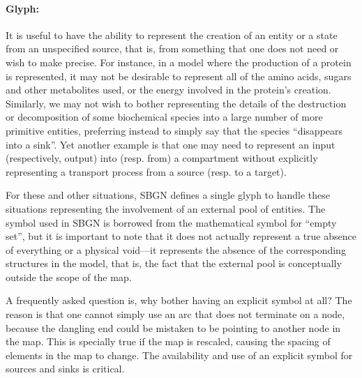 
\paragraph{Glyph: }
\label{sec:sourceSink}

It is useful to have the ability to represent the creation of an entity or
a state from an unspecified source, that is, from something that one does
not need or wish to make precise.  For instance, in a model where the
production of a protein is represented, it may not be desirable to
represent all of the amino acids, sugars and other metabolites used, or the
energy involved in the protein's creation.  Similarly, we may not wish to
bother representing the details of the destruction or decomposition of some
biochemical species into a large number of more primitive entities,
preferring instead to simply say that the species ``disappears into a
sink''.  Yet another example is that one may need to represent an input
(respectively, output) into (resp. from) a compartment without explicitly
representing a transport process from a source (resp. to a target).

For these and other situations, SBGN defines a single glyph to handle
these situations representing the involvement of an external pool of entities.  The symbol
used in SBGN is borrowed from the mathematical symbol for ``empty set'',
but it is important to note that it does not actually represent a true
absence of everything or a physical void---it represents the absence of the
corresponding structures in the model, that is, the fact that the
external pool is conceptually outside the scope of the map.

A frequently asked question is, why bother having an explicit symbol at
all?  The reason is that one cannot simply use an arc that does not
terminate on a node, because the dangling end could be mistaken to be
pointing to another node in the map.  This is specially true if the
map is rescaled, causing the spacing of elements in the map to
change.  The availability and use of an explicit symbol for sources and
sinks is critical.

